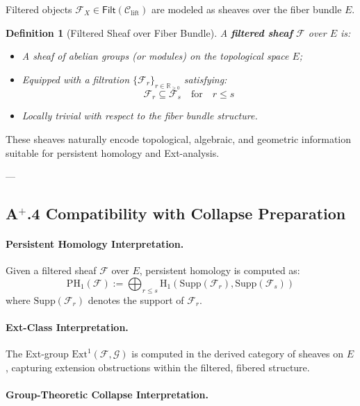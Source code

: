 \documentclass[11pt]{article}
\newtheorem{definition}[theorem]{Definition}
\begin{document}
Filtered objects $\mathcal{F}_X \in \mathsf{Filt}(\mathcal{C}_{\mathrm{lift}})$ are modeled as sheaves over the fiber bundle $E$.

\begin{definition}[Filtered Sheaf over Fiber Bundle]
A \textbf{filtered sheaf} $\mathcal{F}$ over $E$ is:

\begin{itemize}
    \item A sheaf of abelian groups (or modules) on the topological space $E$;
    \item Equipped with a filtration $\{ \mathcal{F}_r \}_{r \in \mathbb{R}_{\geq 0}}$ satisfying:
    \[
    \mathcal{F}_r \subseteq \mathcal{F}_s \quad \text{for} \quad r \leq s
    \]
    \item Locally trivial with respect to the fiber bundle structure.
\end{itemize}
\end{definition}

These sheaves naturally encode topological, algebraic, and geometric information suitable for persistent homology and Ext-analysis.

---

\subsection*{A$^{+}$.4 Compatibility with Collapse Preparation}

\paragraph{Persistent Homology Interpretation.}

Given a filtered sheaf $\mathcal{F}$ over $E$, persistent homology is computed as:
\[
\mathrm{PH}_1(\mathcal{F}) := \bigoplus_{r \leq s} \mathrm{H}_1\left( \mathrm{Supp}(\mathcal{F}_r), \mathrm{Supp}(\mathcal{F}_s) \right)
\]
where $\mathrm{Supp}(\mathcal{F}_r)$ denotes the support of $\mathcal{F}_r$.

\paragraph{Ext-Class Interpretation.}

The Ext-group $\mathrm{Ext}^1(\mathcal{F}, \mathcal{G})$ is computed in the derived category of sheaves on $E$, capturing extension obstructions within the filtered, fibered structure.

\paragraph{Group-Theoretic Collapse Interpretation.}
\end{document}
